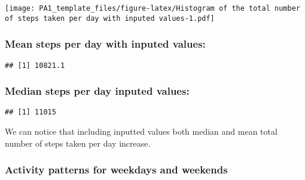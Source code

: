 \documentclass[
]{article}
\newenvironment{Shaded}{\begin{snugshade}}{\end{snugshade}}
\newcommand{\KeywordTok}[1]{\textcolor[rgb]{0.13,0.29,0.53}{\textbf{#1}}}
\newcommand{\NormalTok}[1]{#1}
\newcommand{\OperatorTok}[1]{\textcolor[rgb]{0.81,0.36,0.00}{\textbf{#1}}}
\newcommand{\StringTok}[1]{\textcolor[rgb]{0.31,0.60,0.02}{#1}}
\begin{document}
\texttt{[image: PA1\_template\_files/figure-latex/Histogram of the total number of steps taken per day with inputed values-1.pdf]}

\hypertarget{mean-steps-per-day-with-inputed-values}{%
\subsubsection{Mean steps per day with inputed
values:}\label{mean-steps-per-day-with-inputed-values}}

\begin{Shaded}
\end{Shaded}

\begin{verbatim}
## [1] 10821.1
\end{verbatim}

\hypertarget{median-steps-per-day-inputed-values}{%
\subsubsection{Median steps per day inputed
values:}\label{median-steps-per-day-inputed-values}}

\begin{Shaded}
\end{Shaded}

\begin{verbatim}
## [1] 11015
\end{verbatim}

We can notice that including inputted values both median and mean total
number of steps taken per day increase.

\hypertarget{activity-patterns-for-weekdays-and-weekends}{%
\subsubsection{Activity patterns for weekdays and
weekends}\label{activity-patterns-for-weekdays-and-weekends}}

\begin{Shaded}
\end{Shaded}
\end{document}
